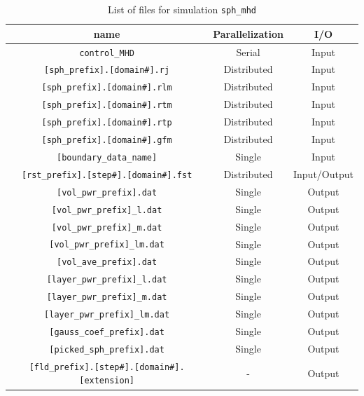 \begin{table}[htdp]
\caption{List of files for simulation {\tt sph\_mhd} }
\begin{center} 
\begin{tabular}{|c|c|c|}
\hline
 name & Parallelization & I/O \\ \hline \hline
\verb|control_MHD| & Serial & Input \\ \hline
\verb|[sph_prefix].[domain#].rj|  & Distributed & Input \\
\verb|[sph_prefix].[domain#].rlm| & Distributed & Input \\
\verb|[sph_prefix].[domain#].rtm| & Distributed & Input \\
\verb|[sph_prefix].[domain#].rtp| & Distributed & Input \\ \hline
\verb|[sph_prefix].[domain#].gfm| & Distributed & Input \\ \hline
\verb|[boundary_data_name]| & Single & Input \\ \hline
\verb|[rst_prefix].[step#].[domain#].fst| &  Distributed & Input/Output  \\ \hline
\verb|[vol_pwr_prefix].dat| & Single & Output \\ \hline
\verb|[vol_pwr_prefix]_l.dat| & Single & Output \\
\verb|[vol_pwr_prefix]_m.dat| & Single & Output \\
\verb|[vol_pwr_prefix]_lm.dat| & Single & Output \\
\verb|[vol_ave_prefix].dat| & Single & Output \\ \hline
\verb|[layer_pwr_prefix]_l.dat| & Single & Output \\
\verb|[layer_pwr_prefix]_m.dat| & Single & Output \\
\verb|[layer_pwr_prefix]_lm.dat| & Single & Output \\ \hline
\verb|[gauss_coef_prefix].dat| & Single & Output   \\
\verb|[picked_sph_prefix].dat| & Single & Output   \\ \hline
\verb|[fld_prefix].[step#].[domain#].[extension]| &  - & Output  \\ \hline
\end{tabular}
\end{center}
\label{table:sph_mhd}
\end{table}
%
\newpage
